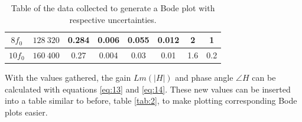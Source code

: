 \documentclass[12pt]{article}
\begin{document}
\begin{table}[H]
{\begin{tabular}{|c|c|c|c|c|c|c|c|}
        $8 f_0$   & $128 \: 320$                                             & 0.284                                                      & 0.006                                                             & 0.055                                                      & 0.012                                                             & 2                                                                         & 1                                                                                  \\ \hline
        $10 f_0$  & $160 \: 400$                                             & 0.27                                                       & 0.004                                                             & 0.03                                                       & 0.01                                                              & 1.6                                                                       & 0.2                                                                                \\ \hline
        \end{tabular}

    }

    \caption{\centering Table of the data collected to generate a Bode plot with respective uncertainties.}
    \label{tab:1}

\end{table}

With the values gathered, the gain $Lm(\lvert H \rvert)$ and phase angle $\angle H$ can be calculated with equations \ref{eq:13} and \ref{eq:14}.
These new values can be inserted into a table similar to before, table \ref{tab:2}, to make plotting corresponding Bode plots easier.
\end{document}
